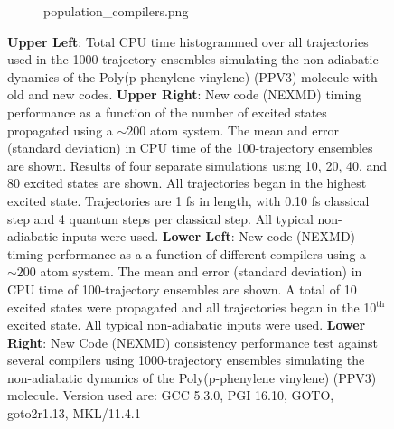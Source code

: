 \documentclass[letterpaper,12pt,titlepage]{article}
\begin{document}
\begin{appendix}
\begin{figure}[h]
\begin{subfigure}[h]{0.425\textwidth}
{population_compilers.png}
        \end{subfigure}
	\caption{\small {\textbf{Upper Left}}: Total CPU time histogrammed over all trajectories used in the 1000-trajectory ensembles simulating the non-adiabatic dynamics of the Poly(p-phenylene vinylene) (PPV3) molecule with old and new codes. {\textbf{Upper Right}}: New code (NEXMD) timing performance as a function of the number of excited states propagated using a $\sim200$ atom system.  The mean and error (standard deviation) in CPU time of the 100-trajectory ensembles are shown.  Results of four separate simulations using 10, 20, 40, and 80 excited states are shown.  All trajectories began in the highest excited state.  Trajectories are 1 fs in length, with 0.10 fs classical step and 4 quantum steps per classical step.  All typical non-adiabatic inputs were used.  {\textbf{Lower Left}}: New code (NEXMD) timing performance as a a function of different compilers using a $\sim200$ atom system.  The mean and error (standard deviation) in CPU time of 100-trajectory ensembles are shown.  A total of 10 excited states were propagated and all trajectories began in the 10$^{\text{th}}$ excited state.  All typical non-adiabatic inputs were used.  {\textbf{Lower Right}}: New Code (NEXMD) consistency performance test against several compilers using 1000-trajectory ensembles simulating the non-adiabatic dynamics of the Poly(p-phenylene vinylene) (PPV3) molecule.  Version used are: GCC 5.3.0, PGI 16.10, GOTO, goto2r1.13, MKL/11.4.1}
\end{figure}

\end{appendix}
\end{document}
